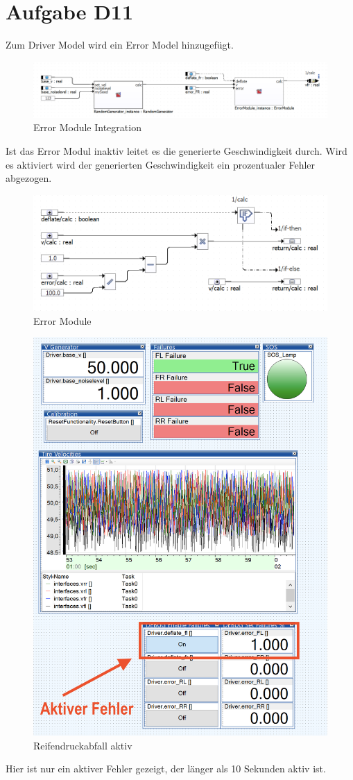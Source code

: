 
\chapter{Aufgabe D11}
Zum Driver Model wird ein Error Model hinzugefügt.
\begin{figure}[H]
	\centering
	\includegraphics[width=1\linewidth]{../Graphiken/Errorintegration.png}
	\caption{Error Module Integration}
	\label{fig:ErrorModuleIntegration}
\end{figure}
Ist das Error Modul inaktiv leitet es die generierte Geschwindigkeit durch. Wird es aktiviert wird der generierten Geschwindigkeit ein prozentualer Fehler abgezogen.
\begin{figure}[H]
	\centering
	\includegraphics[width=0.85\linewidth]{../Graphiken/ErrorModule.png}
	\caption{Error Module}
	\label{fig:ErrorModule}
\end{figure}

\begin{figure}[H]
	\centering
\includegraphics[width=0.85\linewidth]{../Graphiken/aktiveError.png}
\caption{Reifendruckabfall aktiv}
\label{fig:ErrorModule}
\end{figure}
Hier ist nur ein aktiver Fehler gezeigt, der länger als 10 Sekunden aktiv ist.